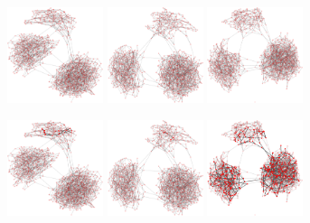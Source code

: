 \begin{figure}
\centering
\includegraphics[width=0.25\textwidth]{batchRun__kHalf=2-2-2_maxUpdate=0.02_noize=0_nbrDepth=1/network0-crop.pdf}
\hfill
\includegraphics[width=0.25\textwidth]{batchRun__kHalf=2-2-2_maxUpdate=0.02_noize=0.01_nbrDepth=1/network0-crop.pdf}
\hfill
\includegraphics[width=0.25\textwidth]{batchRun__kHalf=2-2-2_maxUpdate=0.02_noize=0.1_nbrDepth=1/network0-crop.pdf}

\includegraphics[width=0.25\textwidth]{batchRun__kHalf=2-2-2_maxUpdate=0.02_noize=0_nbrDepth=1/network250-crop.pdf}
\hfill
\includegraphics[width=0.25\textwidth]{batchRun__kHalf=2-2-2_maxUpdate=0.02_noize=0.01_nbrDepth=1/network250-crop.pdf}
\hfill
\includegraphics[width=0.25\textwidth]{batchRun__kHalf=2-2-2_maxUpdate=0.02_noize=0.1_nbrDepth=1/network250-crop.pdf}


\end{figure}
